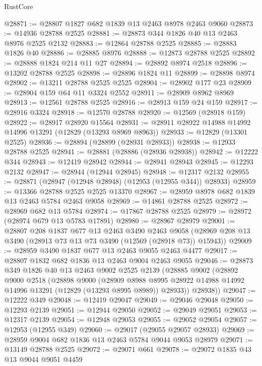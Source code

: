 \begin{lexlean}{RustCore}
\begin{coremodule}
@28871 := @28807 @1827 @682 @1839 @13 @2463 @8978 @2463 @9060
@28873 := @14936 @28788 @2525
@28881 := @28873 @344 @1826 @40 @13 @2463 @8976 @2525 @2132
@28883 := @12864 @28788 @2525
@28885 := @28883 @1826 @40
@28886 := @28885 @8976
@28888 := @12873 @28788 @2525
@28892 := @28888 @1824 @214 @11 @27
@28894 := @28892 @8974 @2518
@28896 := @13202 @28788 @2525
@28898 := @28896 @1824 @11
@28899 := @28898 @8974
@28902 := @13211 @28788 @2525 @2525
@28904 := @28902 @177 @23
@28909 := @28904 @159 @64 @11 @3324 @2552
@28911 := @28909 @8962 @8969
@28913 := @12561 @28788 @2525
@28916 := @28913 @159 @24 @159
@28917 := @28916 @3324
@28918 := @12570 @28788
@28920 := @12569 (@28918 @159)
@28922 := @28917 @28920 @15564
@28931 := @28911 @28922 @14988 @14992 @14996 @13291 (@12829 (@13293 @8969 @8963))
@28933 := @12829 (@13301 @2525)
@28936 := @28894 (@28899 (@28931 @28933))
@28938 := @12933 @28788 @2525
@28941 := @28881 (@28886 (@28936 @28938))
@28942 := @12222 @344
@28943 := @12419 @28942
@28944 := @28941 @28943
@28945 := @12293 @2132
@28947 := @28944 (@12944 @28945)
@28948 := @12317 @2132
@28955 := @28871 (@28947 (@12948 @28948) (@12953 (@12955 @344)) @28933)
@28959 := @13366 @28788 @2525 @2525 @13370
@28967 := @28959 @8978 @682 @1839 @13 @2463 @5784 @2463 @9058
@28969 := @14861 @28788 @2525
@28972 := @28969 @682 @13 @5784
@28974 := @17867 @28788 @2525
@28979 := @28972 (@28974 @679 @13 @5783 @17891)
@28980 := @28967 @28979
@29001 := @28807
    @208
    @1837
    @677
    @13
    @2463
    @3490
    @2463
    @9058
    (@28969 @208 @13 @3490 (@28913 @73 @13 @73 @3490 (@12569 (@28918 @73)) @15943))
@29009 := @28959 @3490 @1837 @677 @13 @2463 @9055 @2463 @4477
@29017 := @28807 @1832 @682 @1836 @13 @2463 @9004 @2463 @9055
@29046 := @28873
    @349
    @1826
    @40
    @13
    @2463
    @9002
    @2525
    @2139
    (@28885
      @9002
      (@28892
        @9000
        @2518
        (@28898
          @9000
          (@28909
            @8988
            @8995
            @28922
            @14988
            @14992
            @14996
            @13291
            (@12829 (@13293 @8995 @8989))
            @28933))
        @28938))
@29047 := @12222 @349
@29048 := @12419 @29047
@29049 := @29046 @29048
@29050 := @12293 @2139
@29051 := @12944 @29050
@29052 := @29049 @29051
@29053 := @12317 @2139
@29054 := @12948 @29053
@29055 := @29052 @29054
@29057 := @12953 (@12955 @349)
@29060 := @29017 (@29055 @29057 @28933)
@29069 := @28959 @9004 @682 @1836 @13 @2463 @5784 @9044 @9053 @28979
@29071 := @13149 @28788 @2525
@29072 := @29071 @661
@29078 := @29072 @1835 @43 @13 @9044 @9051 @4459

\end{coremodule}
\end{lexlean}
